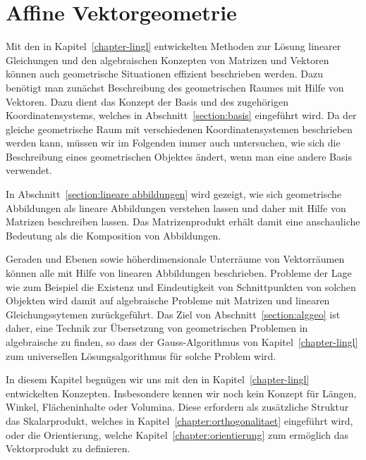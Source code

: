 %
%
%
\chapter{Affine Vektorgeometrie\label{chapter:affin}}
\rhead{}
Mit den in Kapitel~\ref{chapter-lingl} entwickelten Methoden zur Lösung
linearer Gleichungen und den algebraischen Konzepten von Matrizen und Vektoren
können auch geometrische Situationen effizient beschrieben werden.
Dazu benötigt man zunächst Beschreibung des geometrischen Raumes mit Hilfe von
Vektoren.
Dazu dient das Konzept der Basis und des zugehörigen Koordinatensystems,
welches in Abschnitt~\ref{section:basis} eingeführt wird.
Da der gleiche geometrische Raum mit verschiedenen Koordinatensystemen
beschrieben werden kann, müssen wir im Folgenden immer auch untersuchen,
wie sich die Beschreibung eines geometrischen Objektes ändert, wenn man
eine andere Basis verwendet.

In Abschnitt~\ref{section:lineare abbildungen} wird gezeigt, wie sich
geometrische Abbildungen als lineare Abbildungen verstehen lassen und
daher mit Hilfe von Matrizen beschreiben lassen.
Das Matrizenprodukt erhält damit eine anschauliche Bedeutung als die
Komposition von Abbildungen.

Geraden und Ebenen sowie höherdimensionale Unterräume von Vektorräumen
können alle mit Hilfe von linearen Abbildungen beschrieben.
Probleme der Lage wie zum Beispiel die Existenz und Eindeutigkeit von
Schnittpunkten von solchen Objekten wird damit auf algebraische Probleme
mit Matrizen und linearen Gleichungssytemen zurückgeführt.
Das Ziel von Abschnitt~\ref{section:alggeo} ist daher, eine Technik
zur Übersetzung von geometrischen Problemen in algebraische zu finden,
so dass der Gauss-Algorithmus von Kapitel~\ref{chapter-lingl} zum universellen
Lösungsalgorithmus für solche Problem wird.

In diesem Kapitel begnügen wir uns mit den in Kapitel~\ref{chapter-lingl}
entwickelten Konzepten.
Insbesondere kennen wir noch kein Konzept für Längen, Winkel,
Flächeninhalte oder Volumina.
Diese erfordern als zusätzliche Struktur das Skalarprodukt, welches in
Kapitel~\ref{chapter:orthogonalitaet} eingeführt wird, oder die Orientierung,
welche Kapitel~\ref{chapter:orientierung} zum ermöglich das Vektorprodukt
zu definieren.






%

%
%
%
%
%
%

